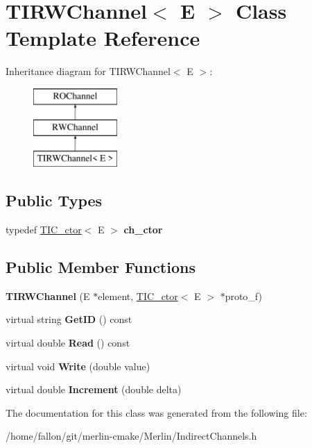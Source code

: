 \hypertarget{classTIRWChannel}{}\section{T\+I\+R\+W\+Channel$<$ E $>$ Class Template Reference}
\label{classTIRWChannel}
Inheritance diagram for T\+I\+R\+W\+Channel$<$ E $>$\+:\begin{figure}[H]
\begin{center}
\leavevmode
\includegraphics[height=3.000000cm]{classTIRWChannel}
\end{center}
\end{figure}
\subsection*{Public Types}
\begin{DoxyCompactItemize}
\item 
\mbox{\label{classTIRWChannel_a6a8b2a52a6018f92e1dc4c3f3b1c7b61}} 
typedef \hyperlink{classTIC__ctor}{T\+I\+C\+\_\+ctor}$<$ E $>$ {\bfseries ch\+\_\+ctor}
\end{DoxyCompactItemize}
\subsection*{Public Member Functions}
\begin{DoxyCompactItemize}
\item 
\mbox{\label{classTIRWChannel_a7d9d367ab28834f2dca1b1449c253cb3}} 
{\bfseries T\+I\+R\+W\+Channel} (E $\ast$element, \hyperlink{classTIC__ctor}{T\+I\+C\+\_\+ctor}$<$ E $>$ $\ast$proto\+\_\+f)
\item 
\mbox{\label{classTIRWChannel_ac61408aa694333f3559053699729efa1}} 
virtual string {\bfseries Get\+ID} () const
\item 
\mbox{\label{classTIRWChannel_aeb2501548897ea3205718a3f41cecbb3}} 
virtual double {\bfseries Read} () const
\item 
\mbox{\label{classTIRWChannel_aaf02639f68bbfa521412491439a70ecb}} 
virtual void {\bfseries Write} (double value)
\item 
\mbox{\label{classTIRWChannel_aa7363bd741ee0c69b320747e474d63d6}} 
virtual double {\bfseries Increment} (double delta)
\end{DoxyCompactItemize}


The documentation for this class was generated from the following file\+:\begin{DoxyCompactItemize}
\item 
/home/fallon/git/merlin-\/cmake/\+Merlin/Indirect\+Channels.\+h\end{DoxyCompactItemize}
